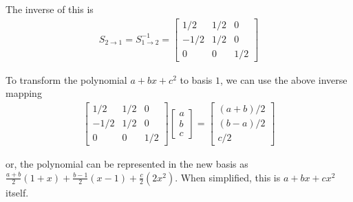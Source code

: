 \documentclass[../../linear_algebra.tex]{subfiles}
\begin{document}
The inverse of this is
\begin{align*}
    S_{2 \to 1} = S_{1 \to 2}^{-1} = \begin{bmatrix}
        1/2 &1/2 &0\\
        -1/2 &1/2 &0\\
        0 &0 &1/2
    \end{bmatrix}
\end{align*}

To transform the polynomial $a + bx + c^{2}$ to basis $1$, we can use the above inverse mapping
\begin{align*}
    \begin{bmatrix}
        1/2 &1/2 &0\\
        -1/2 &1/2 &0\\
        0 &0 &1/2
    \end{bmatrix} \begin{bmatrix}
        a\\ b\\ c
    \end{bmatrix} =
    \begin{bmatrix}
        (a+b)/2\\ (b-a)/2\\ c/2
    \end{bmatrix}
\end{align*}

or, the polynomial can be represented in the new basis as $\frac{a+b}{2} (1+x) + \frac{b-1}{2}(x-1) + \frac{c}{2}(2x^{2})$. When simplified, this is $a + bx + cx^{2}$ itself.
\end{document}
